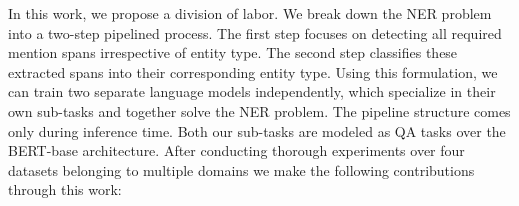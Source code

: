 In this work, we propose a division of labor. We break down the NER problem into a two-step pipelined process. The first step focuses on detecting all required mention spans irrespective of entity type. The second step classifies these extracted spans into their corresponding entity type. Using this formulation, we can train two separate language models independently, which specialize in their own sub-tasks and together solve the NER problem. The pipeline structure comes only during inference time. Both our sub-tasks are modeled as QA tasks over the BERT-base architecture. After conducting thorough experiments over four datasets belonging to multiple domains we make the following contributions through this work:
